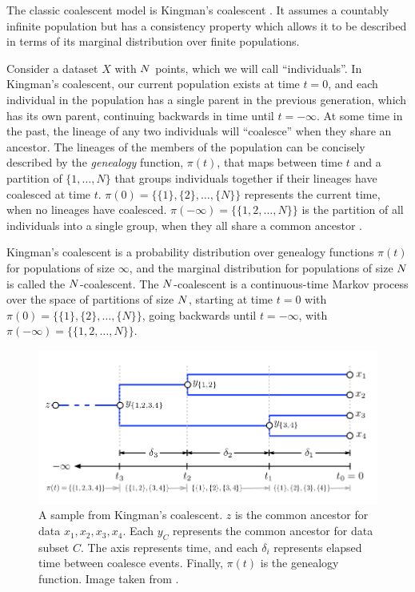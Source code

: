The classic coalescent model is
Kingman's coalescent \citep{Kingman1982}.
It assumes a countably infinite population
but has a consistency property
which allows it to be described
in terms of its marginal distribution
over finite populations.

Consider a dataset $X$ with $N$ points, 
which we will call ``individuals''.
In Kingman's coalescent,
our current population exists at time $t = 0$,
and each individual in the population has a single
parent in the previous generation, which has its own parent,
continuing backwards in time until
$t = -\infty$. 
At some time in the past,
the lineage of any two individuals will ``coalesce''
when they share an ancestor.
The lineages of the members of the population
can be concisely described
by the
\emph{genealogy} function, $\pi(t)$,
that maps between time $t$
and a partition of $\{1, \ldots, N\}$
that groups individuals together
if their lineages have coalesced at time $t$.
$\pi(0) = \{\{1\}, \{2\},\ldots,\{N\}\}$
represents
the current time, when no
lineages have coalesced.
$\pi(-\infty) = \{\{1, 2, \ldots, N\}\}$
is the partition of all
individuals into a single group,
when they all share a common ancestor \citep{Teh2009}.

Kingman's coalescent
is a probability distribution
over genealogy functions $\pi(t)$
for populations of size $\infty$,
and the marginal distribution for
populations of size $N$ is called the $N$-coalescent.
The $N$-coalescent
is a continuous-time
Markov process
over the space of partitions
of size $N$,
starting at time $t = 0$ with
$\pi(0) = \{\{1\}, \{2\},\ldots,\{N\}\}$,
going backwards until  $t = -\infty$,
with
$\pi(-\infty) = \{\{1, 2, \ldots, N\}\}$.

\begin{figure}[H]
  \centering
  \includegraphics[width=\textwidth]{img/trees/coalescent}
  \caption{A sample from Kingman's coalescent. $z$ is
  the common ancestor for data $x_1, x_2, x_3, x_4$. Each $y_C$
  represents the common ancestor for data subset $C$. 
  The axis represents time, and each $\delta_i$ represents elapsed time between
  coalesce events. Finally, $\pi(t)$ is
  the genealogy function. Image taken from \citet{Teh2009}.}
\label{fig:coalescent}
\end{figure}

